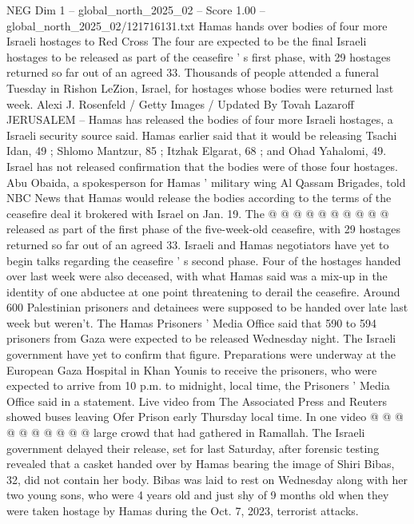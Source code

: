 \begin{textsample}{NEG Dim 1 – global\_north\_2025\_02 – Score 1.00 – global\_north\_2025\_02/121716131.txt}  \label{ex:f1_neg_017}
Hamas hands over bodies of four more Israeli hostages to Red Cross The four are expected to be the final Israeli hostages to be released as part of the ceasefire ' s first phase, with 29 hostages returned so far out of an agreed 33.
Thousands of people attended a funeral Tuesday in Rishon LeZion, Israel, for hostages whose bodies were returned last week.
Alexi J.
Rosenfeld / Getty Images / Updated By Tovah Lazaroff JERUSALEM -- Hamas has released the bodies of four more Israeli hostages, a Israeli security source said.
Hamas earlier said that it would be releasing Tsachi Idan, 49 ; Shlomo Mantzur, 85 ; Itzhak Elgarat, 68 ; and Ohad Yahalomi, 49.
Israel has not released confirmation that the bodies were of those four hostages.
Abu Obaida, a spokesperson for Hamas ' military wing Al Qassam Brigades, told NBC News that Hamas would release the bodies according to the terms of the ceasefire deal it brokered with Israel on Jan. 19.
The @ @ @ @ @ @ @ @ @ @ released as part of the first phase of the five-week-old ceasefire, with 29 hostages returned so far out of an agreed 33.
Israeli and Hamas negotiators have yet to begin talks regarding the ceasefire ' s second phase.
Four of the hostages handed over last week were also deceased, with what Hamas said was a mix-up in the identity of one abductee at one point threatening to derail the ceasefire.
Around 600 Palestinian prisoners and detainees were supposed to be handed over late last week but weren't.
The Hamas Prisoners ' Media Office said that 590 to 594 prisoners from Gaza were expected to be released Wednesday night.
The Israeli government have yet to confirm that figure.
Preparations were underway at the European Gaza Hospital in Khan Younis to receive the prisoners, who were expected to arrive from 10 p.m. to midnight, local time, the Prisoners ' Media Office said in a statement.
Live video from The Associated Press and Reuters showed buses leaving Ofer Prison early Thursday local time.
In one video @ @ @ @ @ @ @ @ @ @ large crowd that had gathered in Ramallah.
The Israeli government delayed their release, set for last Saturday, after forensic testing revealed that a casket handed over by Hamas bearing the image of Shiri Bibas, 32, did not contain her body.
Bibas was laid to rest on Wednesday along with her two young sons, who were 4 years old and just shy of 9 months old when they were taken hostage by Hamas during the Oct. 7, 2023, terrorist attacks.

\end{textsample}

